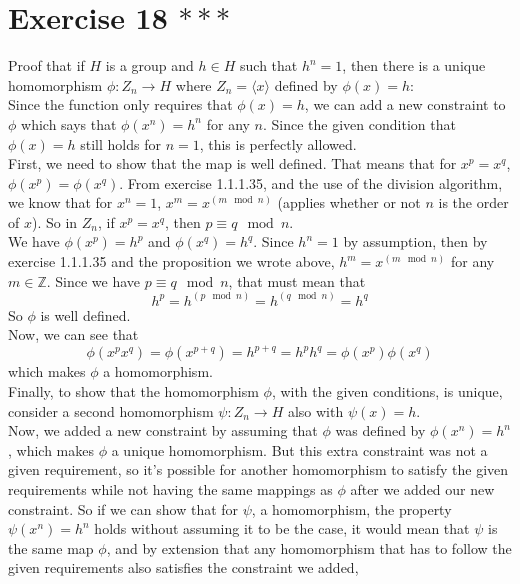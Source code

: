 \documentclass[12pt]{article}
\newcommand{\Z}{\mathbb{Z}}
\begin{document}
    \section*{Exercise 18 $***$}
    Proof that if $H$ is a group and $h \in H$
    such that $h^n = 1$,
    then there is a unique homomorphism $\phi: Z_n \to H$
    where $Z_n = \langle x \rangle$ defined by $\phi(x) = h$: \\
    Since the function only requires that $\phi(x) = h$,
    we can add a new constraint to $\phi$ which says that 
    $\phi(x^n) = h^n$ for any $n$.
    Since the given condition that $\phi(x) = h$ still holds for $n = 1$,
    this is perfectly allowed. \\
    First, we need to show that the map is well defined.
    That means that for $x^p = x^q$, $\phi(x^p) = \phi(x^q)$.
    From exercise 1.1.1.35, and the use of the division
    algorithm, we know that for $x^n = 1$, $x^m = x^{(m \mod n)}$
    (applies whether or not $n$ is the order of $x$).
    So in $Z_n$, if $x^p = x^q$, then $p \equiv q \mod n$. \\
    We have $\phi(x^p) = h^p$ and $\phi(x^q) = h^q$.
    Since $h^n = 1$ by assumption, then by exercise 1.1.1.35
    and the proposition we wrote above,
    $h^m = x^{(m \mod n)}$ for any $m \in \Z$.
    Since we have $p \equiv q \mod n$, that must mean
    that
    \[ h^p = h^{(p \mod n)} = h^{(q \mod n)} = h^{q} \]
    So $\phi$ is well defined. \\
    Now, we can see that
    \[ \phi(x^px^q) = \phi(x^{p + q})
    = h^{p + q}
    = h^ph^q
    = \phi(x^p)\phi(x^q)  \]
    which makes $\phi$ a homomorphism. \\
    Finally, to show that the homomorphism $\phi$, with the given conditions,
    is unique,
    consider a second homomorphism $\psi: Z_n \to H$
    also with $\psi(x) = h$. \\
    Now, we added a new constraint by assuming that $\phi$ was
    defined by $\phi(x^n) = h^n$,
    which makes $\phi$ a unique homomorphism.
    But this extra constraint was not a given requirement,
    so it's possible for another homomorphism to satisfy
    the given requirements while not having the same mappings as $\phi$
    after we added our new constraint.
    So if we can show that for $\psi$, a homomorphism,
    the property $\psi(x^n) = h^n$ holds without assuming it to be the case,
    it would mean that $\psi$ is the same map $\phi$,
    and by extension that any homomorphism that has to follow the given
    requirements also satisfies the constraint we added,
\end{document}
